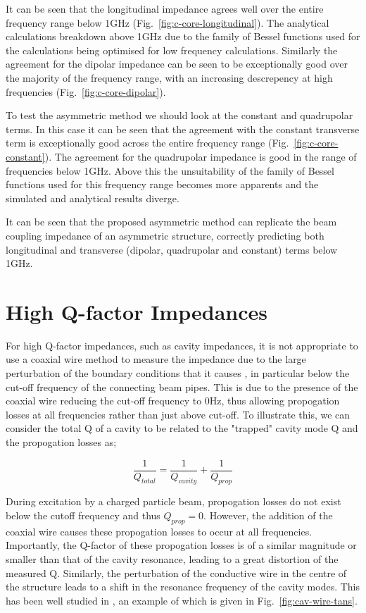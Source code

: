 It can be seen that the longitudinal impedance agrees well over the entire frequency range below 1GHz (Fig.~\ref{fig:c-core-longitudinal}). The analytical calculations breakdown above 1GHz due to the family of Bessel functions used for the calculations being optimised for low frequency calculations. Similarly the agreement for the dipolar impedance can be seen to be exceptionally good over the majority of the frequency range, with an increasing descrepency at high frequencies (Fig.~\ref{fig:c-core-dipolar}).

To test the asymmetric method we should look at the constant and quadrupolar terms. In this case it can be seen that the agreement with the constant transverse term is exceptionally good across the entire frequency range (Fig.~\ref{fig:c-core-constant}). The agreement for the quadrupolar impedance is good in the range of frequencies below 1GHz. Above this the unsuitability of the family of Bessel functions used for this frequency range becomes more apparents and the simulated and analytical results diverge.

It can be seen that the proposed asymmetric method can replicate the beam coupling impedance of an asymmetric structure, correctly predicting both longitudinal and transverse (dipolar, quadrupolar and constant) terms below 1GHz. 

\section{High Q-factor Impedances}

For high Q-factor impedances, such as cavity impedances, it is not appropriate to use a coaxial wire method to measure the impedance due to the large perturbation of the boundary conditions that it causes \cite{Masullo:StretchedWire}, in particular below the cut-off frequency of the connecting beam pipes. This is due to the presence of the coaxial wire reducing the cut-off frequency to 0Hz, thus allowing propogation losses at all frequencies rather than just above cut-off. To illustrate this, we can consider the total Q of a cavity to be related to the "trapped" cavity mode Q and the propogation losses as;

\begin{equation}
\frac{1}{Q_{total}} = \frac{1}{Q_{cavity}} + \frac{1}{Q_{prop}}
\end{equation}

During excitation by a charged particle beam, propogation losses do not exist below the cutoff frequency and thus $Q_{prop} = 0$. However, the addition of the coaxial wire causes these propogation losses to occur at all frequencies. Importantly, the Q-factor of these propogation losses is of a similar magnitude or smaller than that of the cavity resonance, leading to a great distortion of the measured Q. Similarly, the perturbation of the conductive wire in the centre of the structure leads to a shift in the resonance frequency of the cavity modes.  This has been well studied in \cite{Masullo:StretchedWire}, an example of which is given in Fig.~\ref{fig:cav-wire-tans}.


